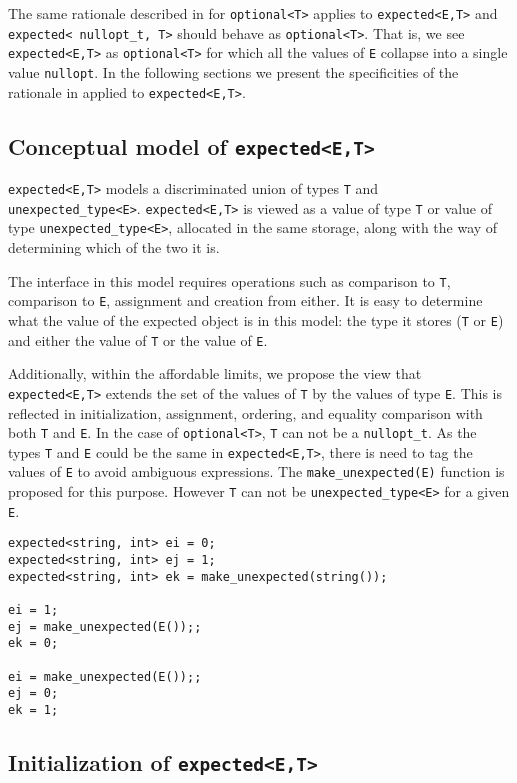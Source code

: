 \documentclass[a4paper,10pt]{article}
\newcommand{\cpp}[1]{\lstinline{#1}}
\begin{document}
The same rationale described in \cite{OptionalRev4} for \cpp{optional<T>} applies to \cpp{expected<E,T>} and \cpp{expected< nullopt_t, T>} should behave as \cpp{optional<T>}.  That is, we see \cpp{expected<E,T>} as \cpp{optional<T>} for which all the values of \cpp{E} collapse into a single value \cpp{nullopt}. In the following sections we present the specificities of the rationale in \cite{OptionalRev4} applied to  \cpp{expected<E,T>}.

\subsection{Conceptual model of \cpp{expected<E,T>}}

\cpp{expected<E,T>} models a discriminated union of types \cpp{T} and \cpp{unexpected_type<E>}. \cpp{expected<E,T>} is viewed as a value of type \cpp{T} or value of type \cpp{unexpected_type<E>}, allocated in the same storage, along with the way of determining which of the two it is. 

The interface in this model requires operations such as comparison to \cpp{T}, comparison to \cpp{E}, assignment and creation from either. It is easy to determine what the value of the expected object is in this model: the type it stores (\cpp{T} or \cpp{E}) and either the value of \cpp{T} or the value of \cpp{E}. 

Additionally, within the affordable limits, we propose the view that \cpp{expected<E,T>} extends the set of the values of \cpp{T} by the values of type \cpp{E}. This is reflected in initialization, assignment, ordering, and equality comparison with both \cpp{T} and \cpp{E}. In the case of  \cpp{optional<T>}, \cpp{T} can not be a \cpp{nullopt_t}. As the types \cpp{T} and \cpp{E} could be the same in \cpp{expected<E,T>}, there is need to tag the values of \cpp{E} to avoid ambiguous expressions. The \cpp{make_unexpected(E)} function is proposed for this purpose. However \cpp{T} can not be  \cpp{unexpected_type<E>} for a given \cpp{E}.

\begin{lstlisting}
expected<string, int> ei = 0;
expected<string, int> ej = 1;
expected<string, int> ek = make_unexpected(string());

ei = 1;
ej = make_unexpected(E());;
ek = 0;

ei = make_unexpected(E());;
ej = 0;
ek = 1;
\end{lstlisting}

\subsection{Initialization of \cpp{expected<E,T>}}
\end{document}
